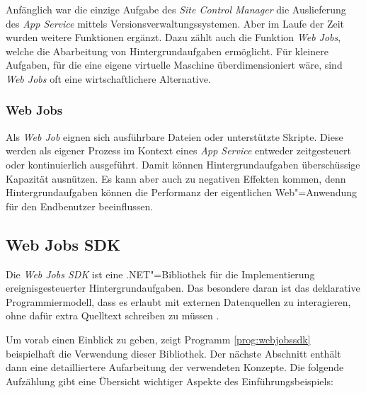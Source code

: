 Anfänglich war die einzige Aufgabe des \textit{Site Control Manager} die Auslieferung des \textit{App Service} mittels Versionsverwaltungssystemen. Aber im Laufe der Zeit wurden weitere Funktionen ergänzt. Dazu zählt auch die Funktion \textit{Web Jobs}, welche die Abarbeitung von Hintergrundaufgaben ermöglicht. Für kleinere Aufgaben, für die eine eigene virtuelle Maschine überdimensioniert wäre, sind \textit{Web Jobs} oft eine wirtschaftlichere Alternative.

\subsubsection{Web Jobs}

Als \textit{Web Job} eignen sich ausführbare Dateien oder unterstützte Skripte. Diese werden als eigener Prozess im Kontext eines \textit{App Service} entweder zeitgesteuert oder kontinuierlich ausgeführt. Damit können Hintergrundaufgaben überschüssige Kapazität ausnützen. Es kann aber auch zu negativen Effekten kommen, denn Hintergrundaufgaben können die Performanz der eigentlichen Web"=Anwendung für den Endbenutzer beeinflussen.

\subsection{Web Jobs SDK}
\label{subsec:webjobssdk}

Die \textit{Web Jobs SDK} ist eine .NET"=Bibliothek für die Implementierung ereignisgesteuerter Hintergrundaufgaben. Das besondere daran ist das deklarative Programmiermodell, dass es erlaubt mit externen Datenquellen zu interagieren, ohne dafür extra Quelltext schreiben zu müssen \cite{WebJobsSdkBindingAttributes}.

Um vorab einen Einblick zu geben, zeigt Programm \ref{prog:webjobssdk} beispielhaft die Verwendung dieser Bibliothek. Der nächste Abschnitt enthält dann eine detailliertere Aufarbeitung der verwendeten Konzepte. Die folgende Aufzählung gibt eine Übersicht wichtiger Aspekte des Einführungsbeispiels:

